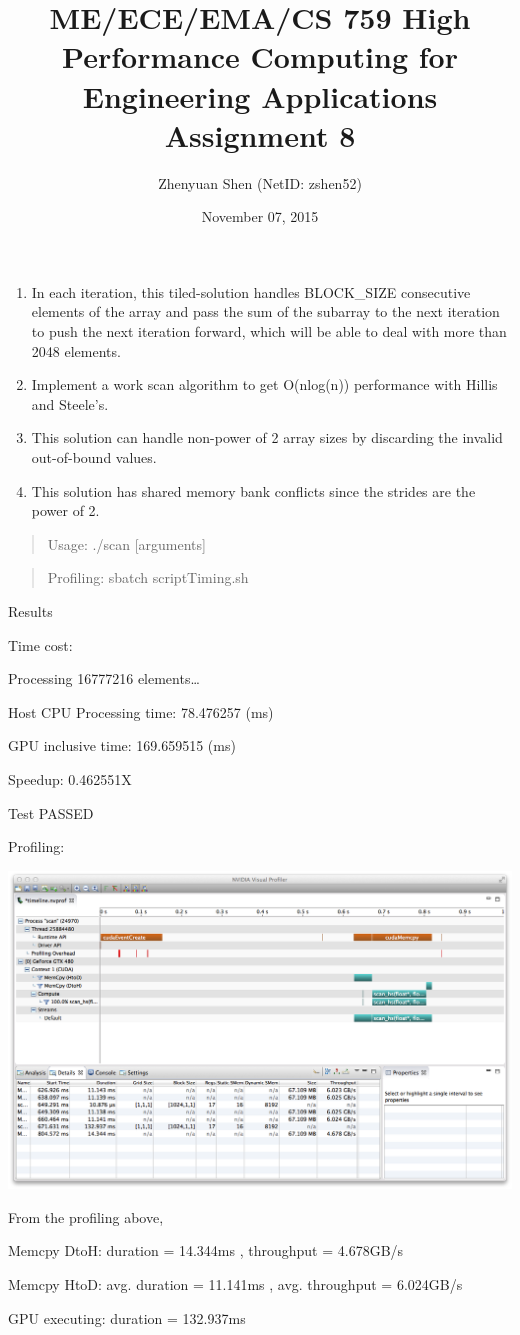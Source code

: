 \documentclass[]{article}
\title{ME/ECE/EMA/CS 759 High Performance Computing for Engineering
Applications Assignment 8}
\author{Zhenyuan Shen (NetID: zshen52)}
\date{November 07, 2015}
\begin{document}
\maketitle


\begin{enumerate}
\def\labelenumi{(\Alph{enumi})}
\item
  In each iteration, this tiled-solution handles BLOCK\_SIZE consecutive
  elements of the array and pass the sum of the subarray to the next
  iteration to push the next iteration forward, which will be able to
  deal with more than 2048 elements.
\item
  Implement a work scan algorithm to get O(nlog(n)) performance with
  Hillis and Steele's.
\item
  This solution can handle non-power of 2 array sizes by discarding the
  invalid out-of-bound values.
\item
  This solution has shared memory bank conflicts since the strides are
  the power of 2.
\end{enumerate}

\begin{quote}
Usage: ./scan {[}arguments{]}
\end{quote}

\begin{quote}
Profiling: sbatch scriptTiming.sh
\end{quote}

Results

Time cost:

Processing 16777216 elements\ldots{}

Host CPU Processing time: 78.476257 (ms)

GPU inclusive time: 169.659515 (ms)

Speedup: 0.462551X

Test PASSED

Profiling:

\includegraphics{./hw08.png}

From the profiling above,

Memcpy DtoH: duration = 14.344ms , throughput = 4.678GB/s

Memcpy HtoD: avg. duration = 11.141ms , avg. throughput = 6.024GB/s

GPU executing: duration = 132.937ms
\end{document}
